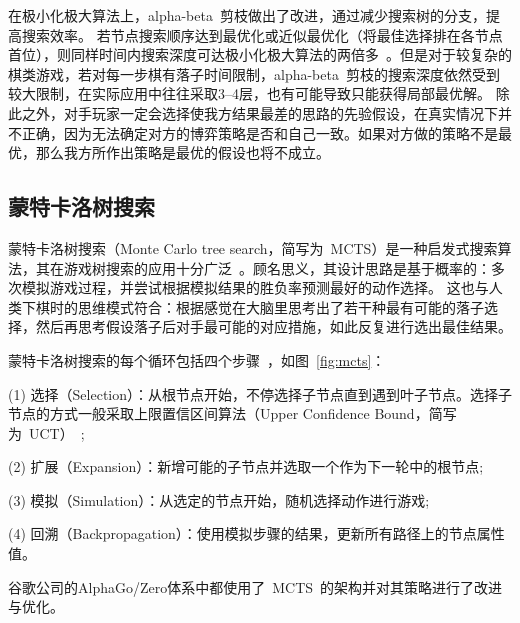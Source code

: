 在极小化极大算法上，alpha-beta~剪枝做出了改进，通过减少搜索树的分支，提高搜索效率。
若节点搜索顺序达到最优化或近似最优化（将最佳选择排在各节点首位），则同样时间内搜索深度可达极小化极大算法的两倍多~\cite{KNUTH1975293abp}。但是对于较复杂的棋类游戏，若对每一步棋有落子时间限制，alpha-beta~剪枝的搜索深度依然受到较大限制，在实际应用中往往采取3--4层，也有可能导致只能获得局部最优解。
除此之外，对手玩家一定会选择使我方结果最差的思路的先验假设，在真实情况下并不正确，因为无法确定对方的博弈策略是否和自己一致。如果对方做的策略不是最优，那么我方所作出策略是最优的假设也将不成立。

\subsection{蒙特卡洛树搜索}
蒙特卡洛树搜索（Monte Carlo tree search，简写为~MCTS）是一种启发式搜索算法，其在游戏树搜索的应用十分广泛~\cite{10.1007/978-3-540-75538-8_7}。顾名思义，其设计思路是基于概率的：多次模拟游戏过程，并尝试根据模拟结果的胜负率预测最好的动作选择。
这也与人类下棋时的思维模式符合：根据感觉在大脑里思考出了若干种最有可能的落子选择，然后再思考假设落子后对手最可能的对应措施，如此反复进行选出最佳结果。

蒙特卡洛树搜索的每个循环包括四个步骤~\cite{RePEc:wsi:nmncxx:v:04:y:2008:i:03:n:s1793005708001094}，如图~\ref{fig:mcts}：

(1) 选择（Selection）：从根节点开始，不停选择子节点直到遇到叶子节点。选择子节点的方式一般采取上限置信区间算法（Upper Confidence Bound，简写为~UCT）~\cite{10.1007/11871842_29};

(2) 扩展（Expansion）：新增可能的子节点并选取一个作为下一轮中的根节点;

(3) 模拟（Simulation）：从选定的节点开始，随机选择动作进行游戏;

(4) 回溯（Backpropagation）：使用模拟步骤的结果，更新所有路径上的节点属性值。

谷歌公司的AlphaGo/Zero体系中都使用了~MCTS~的架构并对其策略进行了改进与优化。


